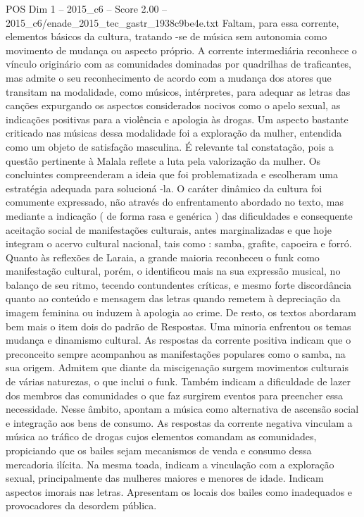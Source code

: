 \begin{textsample}{POS Dim 1 – 2015\_c6 – Score 2.00 – 2015\_c6/enade\_2015\_tec\_gastr\_1938c9be4e.txt}
Faltam, para essa corrente, elementos básicos da cultura, tratando -se de música sem autonomia como movimento de mudança ou aspecto próprio.
A corrente intermediária reconhece o vínculo originário com as comunidades dominadas por quadrilhas de traficantes, mas admite o seu reconhecimento de acordo com a mudança dos atores que transitam na modalidade, como músicos, intérpretes, para adequar as letras das canções expurgando os aspectos considerados nocivos como o apelo sexual, as indicações positivas para a violência e apologia às drogas.
Um aspecto bastante criticado nas músicas dessa modalidade foi a exploração da mulher, entendida como um objeto de satisfação masculina.
É relevante tal constatação, pois a questão pertinente à Malala reflete a luta pela valorização da mulher.
Os concluintes compreenderam a ideia que foi problematizada e escolheram uma estratégia adequada para solucioná -la.
O caráter dinâmico da cultura foi comumente expressado, não através do enfrentamento abordado no texto, mas mediante a indicação ( de forma rasa e genérica ) das dificuldades e consequente aceitação social de manifestações culturais, antes marginalizadas e que hoje integram o acervo cultural nacional, tais como : samba, grafite, capoeira e forró.
Quanto às reflexões de Laraia, a grande maioria reconheceu o funk como manifestação cultural, porém, o identificou mais na sua expressão musical, no balanço de seu ritmo, tecendo contundentes críticas, e mesmo forte discordância quanto ao conteúdo e mensagem das letras quando remetem à depreciação da imagem feminina ou induzem à apologia ao crime.
De resto, os textos abordaram bem mais o item dois do padrão de Respostas.
Uma minoria enfrentou os temas mudança e dinamismo cultural.
As respostas da corrente positiva indicam que o preconceito sempre acompanhou as manifestações populares como o samba, na sua origem.
Admitem que diante da miscigenação surgem movimentos culturais de várias naturezas, o que inclui o funk.
Também indicam a dificuldade de lazer dos membros das comunidades o que faz surgirem eventos para preencher essa necessidade.
Nesse âmbito, apontam a música como alternativa de ascensão social e integração aos bens de consumo.
As respostas da corrente negativa vinculam a música ao tráfico de drogas cujos elementos comandam as comunidades, propiciando que os bailes sejam mecanismos de venda e consumo dessa mercadoria ilícita.
Na mesma toada, indicam a vinculação com a exploração sexual, principalmente das mulheres maiores e menores de idade.
Indicam aspectos imorais nas letras.
Apresentam os locais dos bailes como inadequados e provocadores da desordem pública.

\end{textsample}
